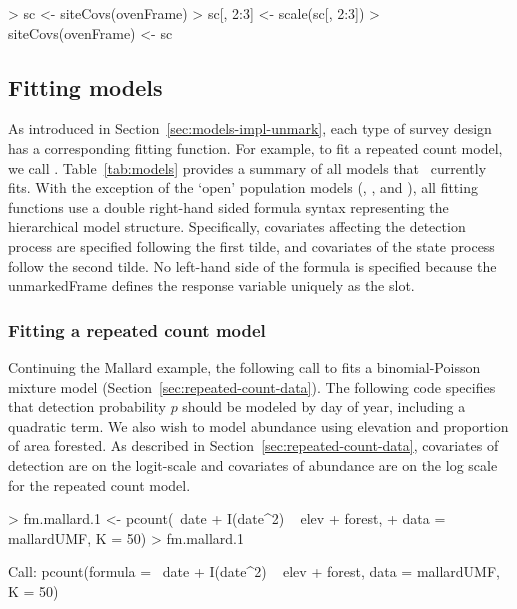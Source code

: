 \documentclass[article,shortnames]{jss}
\newcommand{\um}{\pkg{unmarked}}
\begin{document}
{\begin{Schunk}
\begin{Sinput}
> sc <- siteCovs(ovenFrame)
> sc[, 2:3] <- scale(sc[, 2:3])
> siteCovs(ovenFrame) <- sc
\end{Sinput}
\end{Schunk}



\subsection{Fitting models}
\label{sec:fitting-models}

As introduced in Section~\ref{sec:models-impl-unmark}, each type of 
survey design 
has a corresponding fitting function.  For example, to fit a repeated count
model, we call .  Table~\ref{tab:models} provides a
summary of all models that \um\ currently fits.  With the exception of the 
`open' population models (, , and 
), all fitting functions use a double right-hand sided 
formula syntax representing the hierarchical model structure.  
Specifically, covariates affecting the detection process are specified 
following the first tilde, and covariates of the state process follow the 
second tilde. No left-hand side of the formula is specified because the 
unmarkedFrame defines the response variable uniquely as the  slot.

\subsubsection{Fitting a repeated count model}

Continuing the Mallard example, the following call to  fits a 
binomial-Poisson mixture model (Section~\ref{sec:repeated-count-data}).  The 
following code specifies that detection probability $p$ should be modeled by 
day of year, including a quadratic term.  We also wish to model abundance 
using elevation and proportion of area forested.  As described in 
Section~\ref{sec:repeated-count-data}, covariates of detection are on the 
logit-scale and covariates of abundance are on the log scale for the 
repeated count model.

\begin{Schunk}
\begin{Sinput}
> fm.mallard.1 <- pcount(~date + I(date^2) ~ elev + forest, 
+     data = mallardUMF, K = 50)
> fm.mallard.1
\end{Sinput}
\begin{Soutput}
Call:
pcount(formula = ~date + I(date^2) ~ elev + forest, data = mallardUMF, 
    K = 50)


\end{Soutput}
\end{Schunk}}
\end{document}
